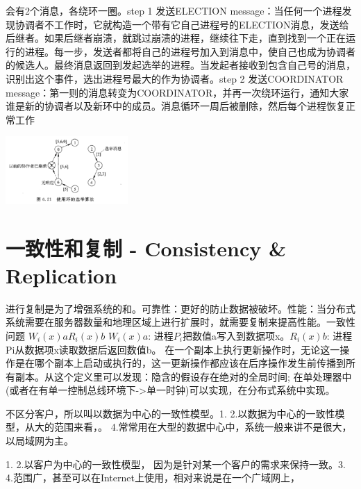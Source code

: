 \documentclass[twoside]{ctexart}
\begin{document}
\begin{multicols}{2}
   会有2个消息，各绕环一圈。step 1 发送ELECTION message：当任何一个进程发现协调者不工作时，它就构造一个带有它自己进程号的ELECTION消息，发送给后继者。如果后继者崩溃，就跳过崩溃的进程，继续往下走，直到找到一个正在运行的进程。每一步，发送者都将自己的进程号加入到消息中，使自己也成为协调者的候选人。最终消息返回到发起选举的进程。当发起者接收到包含自己号的消息，识别出这个事件，选出进程号最大的作为协调者。step 2 发送COORDINATOR message：第一则的消息转变为COORDINATOR，并再一次绕环运行，通知大家谁是新的协调者以及新环中的成员。消息循环一周后被删除，然后每个进程恢复正常工作

\includegraphics[width=0.35\textwidth,keepaspectratio]{pics/ring.png}

  \section{一致性和复制 - Consistency \& Replication} 进行复制是为了增强系统的和。可靠性：更好的防止数据被破坏。性能：当分布式系统需要在服务器数量和地理区域上进行扩展时，就需要复制来提高性能。一致性问题 \(W_{i}(x)a\)\(R_{i}(x)b\) \(W_{i}(x)a\): 进程\(P_{i}\)把数值a写入到数据项x。\(R_{i}(x)b\): 进程Pi从数据项x读取数据后返回数值b。   在一个副本上执行更新操作时，无论这一操作是在哪个副本上启动或执行的，这一更新操作都应该在后序操作发生前传播到所有副本。从这个定义里可以发现：隐含的假设存在绝对的全局时间; 在单处理器中(或者在有单一控制总线环境下-\textgreater 单一时钟)可以实现，在分布式系统中实现。

   不区分客户，所以叫以数据为中心的一致性模型。1. 2.以数据为中心的一致性模型，从大的范围来看，。 4.常常用在大型的数据中心中，系统一般来讲不是很大，以局域网为主。 

   1. 2.以客户为中心的一致性模型， 因为是针对某一个客户的需求来保持一致。3. 4.范围广，甚至可以在Internet上使用，相对来说是在一个广域网上， 
  

\end{multicols}
\end{document}
